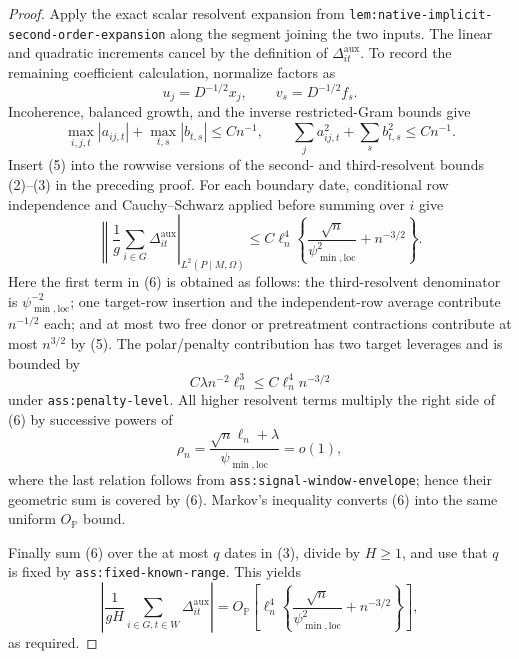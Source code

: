 \documentclass{article}
\begin{document}
\begin{proof}
Apply the exact scalar resolvent expansion from \texttt{lem:native-implicit-second-order-expansion} along the segment joining the two inputs.  The linear and quadratic increments cancel by the definition of \(\Delta^{\mathrm{aux}}_{it}\).  To record the remaining coefficient calculation, normalize factors as
\[
 u_j=D^{-1/2}x_j,
 \qquad v_s=D^{-1/2}f_s.
\]
Incoherence, balanced growth, and the inverse restricted-Gram bounds give
\[
 \max_{i,j,t}|a_{ij,t}|+\max_{t,s}|b_{t,s}|\le Cn^{-1},
 \qquad
 \sum_j a_{ij,t}^2+\sum_s b_{t,s}^2\le Cn^{-1}.
 \tag{5}
\]
Insert (5) into the rowwise versions of the second- and third-resolvent bounds (2)--(3) in the preceding proof.  For each boundary date, conditional row independence and Cauchy--Schwarz applied before summing over \(i\) give
\[
 \left\|
  \frac1g\sum_{i\in G}\Delta^{\mathrm{aux}}_{it}
 \right|_{L^2(P\mid M,\Omega)}
 \le C\ell_n^4
 \left\{\frac{\sqrt n}{\psi_{\min,\mathrm{loc}}^2}
              +n^{-3/2}\right\}.
 \tag{6}
\]
Here the first term in (6) is obtained as follows: the third-resolvent denominator is \(\psi_{\min,\mathrm{loc}}^{-2}\); one target-row insertion and the independent-row average contribute \(n^{-1/2}\) each; and at most two free donor or pretreatment contractions contribute at most \(n^{3/2}\) by (5).  The polar/penalty contribution has two target leverages and is bounded by
\[
 C\lambda n^{-2}\ell_n^3
 \le C\ell_n^4n^{-3/2}
 \tag{7}
\]
under \texttt{ass:penalty-level}.  All higher resolvent terms multiply the right side of (6) by successive powers of
\[
 \rho_n=\frac{\sqrt n\ell_n+\lambda}{\psi_{\min,\mathrm{loc}}}=o(1),
\]
where the last relation follows from \texttt{ass:signal-window-envelope}; hence their geometric sum is covered by (6).  Markov's inequality converts (6) into the same uniform \(O_{\mathbb P}\) bound.

Finally sum (6) over the at most \(q\) dates in (3), divide by \(H\ge1\), and use that \(q\) is fixed by \texttt{ass:fixed-known-range}.  This yields
\[
 \left|\frac1{gH}\sum_{i\in G,t\in W}\Delta^{\mathrm{aux}}_{it}\right|
 =O_{\mathbb P}\!\left[
 \ell_n^4\left\{\frac{\sqrt n}{\psi_{\min,\mathrm{loc}}^2}
 +n^{-3/2}\right\}\right],
\]
as required.
\end{proof}
\end{document}
